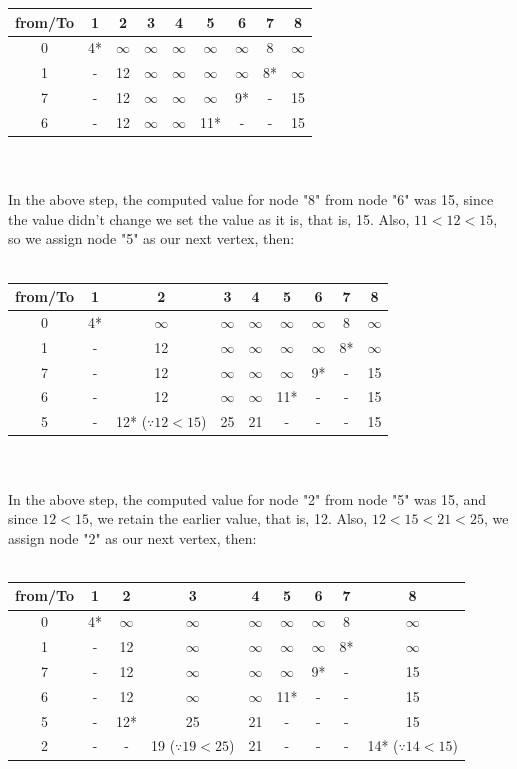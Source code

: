 \begin{tabular}{c | c| c| c| c| c| c| c| c}
	from/To & 1 & 2 & 3 & 4 & 5 & 6 & 7 & 8 \\
	\hline
	0 & 4* & $\infty$ & $\infty$& $\infty$& $\infty$& $\infty$ & 8 & $\infty$\\
	1 & - & 12 & $\infty$& $\infty$& $\infty$& $\infty$ & 8* & $\infty$\\
	7 & - & 12 & $\infty$& $\infty$& $\infty$& 9* & - & 15\\
	6 & - & 12 & $\infty$& $\infty$& 11* & - & - & 15 \\
\end{tabular}\\\\
In the above step, the computed value for node "8" from node "6" was 15, since the value didn't change we set the value as it is, that is, 15. Also, $ 11 < 12 < 15 $, so we assign node "5" as our next vertex, then:\\\\
\begin{tabular}{c | c| c| c| c| c| c| c| c}
	from/To & 1 & 2 & 3 & 4 & 5 & 6 & 7 & 8 \\
	\hline
	0 & 4* & $\infty$ & $\infty$& $\infty$& $\infty$& $\infty$ & 8 & $\infty$\\
	1 & - & 12 & $\infty$& $\infty$& $\infty$& $\infty$ & 8* & $\infty$\\
	7 & - & 12 & $\infty$& $\infty$& $\infty$& 9* & - & 15\\
	6 & - & 12 & $\infty$& $\infty$& 11* & - & - & 15 \\
	5 & - & 12* ($\because 12 < 15$) & 25 & 21 & - & - & - & 15 \\
\end{tabular}\\\\
In the above step, the computed value for node "2" from node "5" was 15, and since $ 12 < 15 $, we retain the earlier value, that is, 12. Also, $ 12 < 15 < 21 < 25 $, we assign node "2" as our next vertex, then:\\\\
\begin{tabular}{c | c| c| c| c| c| c| c| c}
	from/To & 1 & 2 & 3 & 4 & 5 & 6 & 7 & 8 \\
	\hline
	0 & 4* & $\infty$ & $\infty$& $\infty$& $\infty$& $\infty$ & 8 & $\infty$\\
	1 & - & 12 & $\infty$& $\infty$& $\infty$& $\infty$ & 8* & $\infty$\\
	7 & - & 12 & $\infty$& $\infty$& $\infty$& 9* & - & 15\\
	6 & - & 12 & $\infty$& $\infty$& 11* & - & - & 15 \\
	5 & - & 12* & 25 & 21 & - & - & - & 15 \\
	2 & - & - & 19 ($\because 19 < 25$)& 21 & - & - & - & 14* ($\because 14 < 15$)\\
\end{tabular}\\\\
